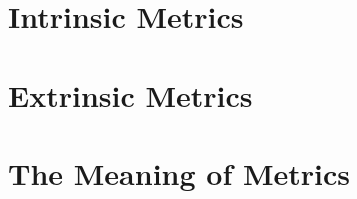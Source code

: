 \documentclass[letterpaper]{report}
\begin{document}
\begin{comment}
\chapter{Emergent Language as Engineering}
\section{Methods of engineering}
\section{Current literature}
\section{Case study: ???}

\end{comment}
\begin{comment}
\chapter{Measuring Progress}
\section{What a metric is}
\section{Characteristic-driven metrics}
\section{Data-driven metrics}

\end{comment}


\chapter{Intrinsic Metrics}
\chapter{Extrinsic Metrics}
\chapter{The Meaning of Metrics}



\end{document}
